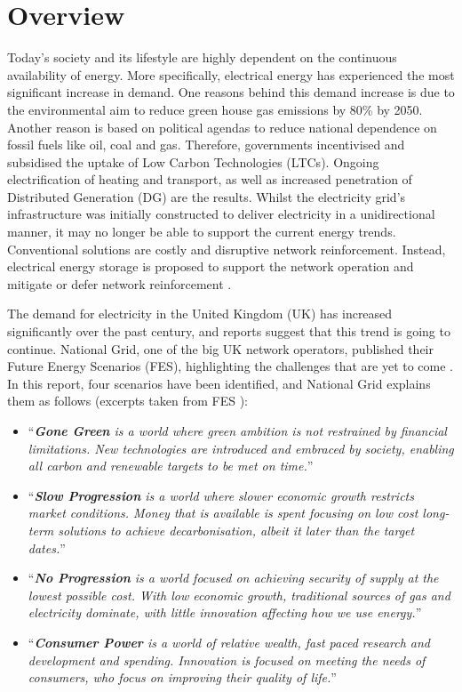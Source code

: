 \section{Overview}
\label{ch-introduction:sec:overview}

Today's society and its lifestyle are highly dependent on the continuous availability of energy.
More specifically, electrical energy has experienced the most significant increase in demand.
One reasons behind this demand increase is due to the environmental aim to reduce green house gas emissions by 80\% by 2050.
Another reason is based on political agendas to reduce national dependence on fossil fuels like oil, coal and gas.
Therefore, governments incentivised and subsidised the uptake of Low Carbon Technologies (LTCs).
Ongoing electrification of heating and transport, as well as increased penetration of Distributed Generation (DG) are the results.
Whilst the electricity grid's infrastructure was initially constructed to deliver electricity in a unidirectional manner, it may no longer be able to support the current energy trends.
Conventional solutions are costly and disruptive network reinforcement.
Instead, electrical energy storage is proposed to support the network operation and mitigate or defer network reinforcement \cite{Manz2012, Kleinberg2014}.

The demand for electricity in the United Kingdom (UK) has increased significantly over the past century, and reports suggest that this trend is going to continue.
National Grid, one of the big UK network operators, published their Future Energy Scenarios (FES), highlighting the challenges that are yet to come \cite{FES2015}.
In this report, four scenarios have been identified, and National Grid explains them as follows (excerpts taken from FES \cite{FES2015}):

\begin{itemize}
	\item ``\textit{\textbf{Gone Green} is a world where green ambition is not restrained by financial limitations. New technologies are introduced and embraced by society, enabling all carbon and renewable targets to be met on time.}''
	\item ``\textit{\textbf{Slow Progression} is a world where slower economic growth restricts market conditions. Money that is available is spent focusing on low cost long-term solutions to achieve decarbonisation, albeit it later than the target dates.}''
	\item ``\textit{\textbf{No Progression} is a world focused on achieving security of supply at the lowest possible cost. With low economic growth, traditional sources of gas and electricity dominate, with little innovation affecting how we use energy.}''
	\item ``\textit{\textbf{Consumer Power} is a world of relative wealth, fast paced research and development and spending. Innovation is focused on meeting the needs of consumers, who focus on improving their quality of life.}''
\end{itemize}

